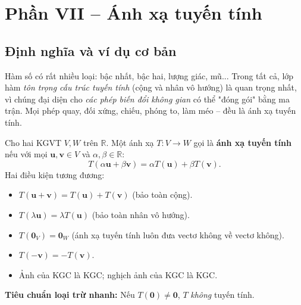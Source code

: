 \documentclass[12pt,a4paper]{article}
\begin{document}
\newpage

\section{Phần VII -- Ánh xạ tuyến tính}

\subsection{Định nghĩa và ví dụ cơ bản}

\begin{dongco}
Hàm số có rất nhiều loại: bậc nhất, bậc hai, lượng giác, mũ... Trong tất cả, lớp hàm \emph{tôn trọng cấu trúc tuyến tính} (cộng và nhân vô hướng) là quan trọng nhất, vì chúng đại diện cho \emph{các phép biến đổi không gian} có thể "đóng gói" bằng ma trận. Mọi phép quay, đối xứng, chiếu, phóng to, làm méo -- đều là ánh xạ tuyến tính.
\end{dongco}

\begin{dinhnghia}
  Cho hai KGVT $V, W$ trên $\mathbb{R}$. Một ánh xạ $T: V \to W$ gọi là \textbf{ánh xạ tuyến tính} nếu với mọi $\mathbf{u}, \mathbf{v} \in V$ và $\alpha, \beta \in \mathbb{R}$:
  \[
    T(\alpha \mathbf{u} + \beta \mathbf{v}) = \alpha T(\mathbf{u}) + \beta T(\mathbf{v}).
  \]
  Hai điều kiện tương đương:
  \begin{itemize}
    \item $T(\mathbf{u}+\mathbf{v}) = T(\mathbf{u}) + T(\mathbf{v})$ (bảo toàn cộng).
    \item $T(\lambda \mathbf{u}) = \lambda T(\mathbf{u})$ (bảo toàn nhân vô hướng).
  \end{itemize}
\end{dinhnghia}

\begin{tinhchat}[title={Hệ quả tức thì}]
\begin{itemize}
  \item $T(\mathbf{0}_V) = \mathbf{0}_W$ (ánh xạ tuyến tính luôn đưa vectơ không về vectơ không).
  \item $T(-\mathbf{v}) = -T(\mathbf{v})$.
  \item Ảnh của KGC là KGC; nghịch ảnh của KGC là KGC.
\end{itemize}
\textbf{Tiêu chuẩn loại trừ nhanh:} Nếu $T(\mathbf{0}) \ne \mathbf{0}$, $T$ \emph{không} tuyến tính.
\end{tinhchat}
\end{document}
